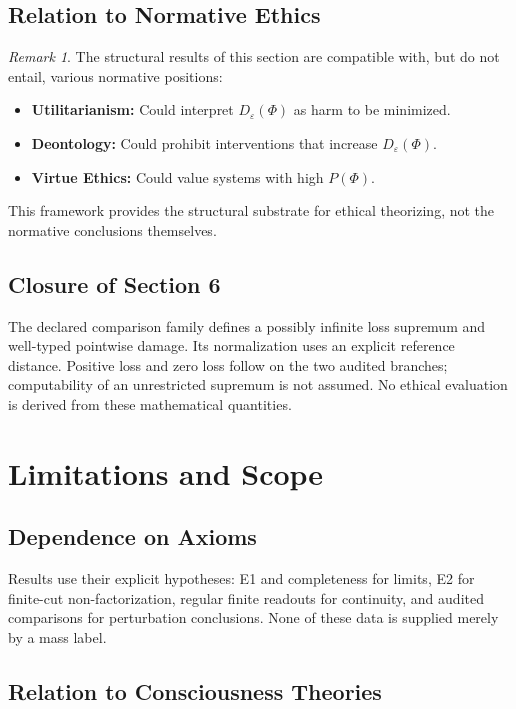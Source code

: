 \documentclass[11pt,a4paper]{article}
\theoremstyle{plain}
\theoremstyle{definition}
\theoremstyle{remark}
\newtheorem{remark}[theorem]{Remark}
\begin{document}
\subsection{Relation to Normative Ethics}

\begin{remark}
The structural results of this section are compatible with, but do not entail, various normative positions:
\begin{itemize}[leftmargin=*]
    \item \textbf{Utilitarianism:} Could interpret $D_\varepsilon(\Phi)$ as harm to be minimized.
    \item \textbf{Deontology:} Could prohibit interventions that increase $D_\varepsilon(\Phi)$.
    \item \textbf{Virtue Ethics:} Could value systems with high $P(\Phi)$.
\end{itemize}
This framework provides the structural substrate for ethical theorizing, not the normative conclusions themselves.
\end{remark}

\subsection{Closure of Section 6}
The declared comparison family defines a possibly infinite loss supremum and well-typed pointwise damage. Its normalization uses an explicit reference distance. Positive loss and zero loss follow on the two audited branches; computability of an unrestricted supremum is not assumed. No ethical evaluation is derived from these mathematical quantities.

\section{Limitations and Scope}

\subsection{Dependence on Axioms}

Results use their explicit hypotheses: E1 and completeness for limits, E2 for finite-cut non-factorization, regular finite readouts for continuity, and audited comparisons for perturbation conclusions. None of these data is supplied merely by a mass label.

\subsection{Relation to Consciousness Theories}
\end{document}
